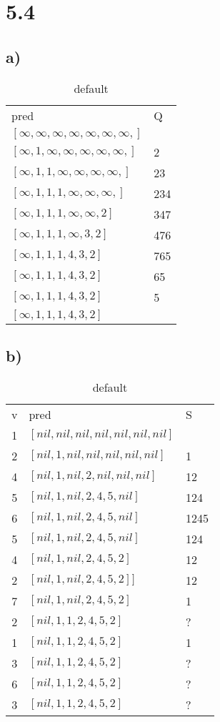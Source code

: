 \documentclass[12pt.twoside,a4paper,notitlepage,parskip]{scrartcl}
\begin{document}
\section*{5.4}
\subsection*{a)}
\begin{table}[htdp]
\caption{default}
\begin{center}
\begin{tabular}{|l|l|}
	pred & Q \\
	 $[\infty,\infty,\infty,\infty,\infty,\infty,\infty,]$ &  \\
	 $[\infty,1,\infty,\infty,\infty,\infty,\infty,]$ & 2 \\
	 $[\infty,1,1,\infty,\infty,\infty,\infty,]$ & 23 \\
	$ [\infty,1,1,1,\infty,\infty,\infty,]$ & 234 \\
	 $[\infty,1,1,1,\infty,\infty,2]$ & 347 \\
	$[\infty,1,1,1,\infty,3,2]$ & 476  \\
	$[\infty,1,1,1,4,3,2]$ & 765  \\
	$[\infty,1,1,1,4,3,2]$ & 65  \\
	$[\infty,1,1,1,4,3,2]$ & 5  \\
	$[\infty,1,1,1,4,3,2]$ &   \\
\end{tabular}
\end{center}
\label{default}
\end{table}%

\subsection*{b)}
\begin{table}[htdp]
\caption{default}
\begin{center}
\begin{tabular}{|c|l|l|}
	v &pred & S \\
	1 &$[nil,nil,nil,nil,nil,nil,nil]$ &  \\
	2 &$[nil,1,nil,nil,nil,nil,nil]$ & 1 \\
	4 &$[nil,1,nil,2,nil,nil,nil]$ &  12\\ 
	5 &$[nil,1,nil,2,4,5,nil]$ &  124\\
	6 &$[nil,1,nil,2,4,5,nil]$ &  1245\\
	5 &$[nil,1,nil,2,4,5,nil]$ &  124\\
	4 &$[nil,1,nil,2,4,5,2]$ &   12\\
	2&$[nil,1,nil,2,4,5,2] ]$ &   12\\
	7&$[nil,1,nil,2,4,5,2]$  &   1\\
	2&$[nil,1,1,2,4,5,2]$  &   ?\\
	1&$[nil,1,1,2,4,5,2]$  &   1\\
	3&$[nil,1,1,2,4,5,2]$  &   ?\\
	6&$[nil,1,1,2,4,5,2]$  &   ?\\
	3&$[nil,1,1,2,4,5,2]$  &   ?\\
\end{tabular}
\end{center}
\label{default}
\end{table}%
\end{document}
